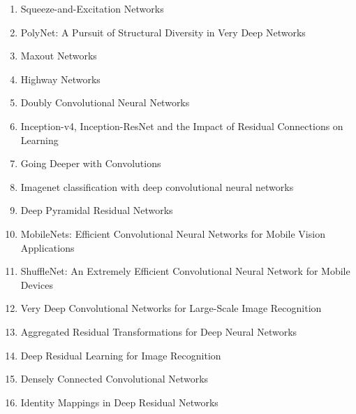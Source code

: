 \documentclass[acmlarge]{acmart}
\begin{document}
\begin{enumerate}
	\item Squeeze-and-Excitation Networks \cite{hu2017squeezeandexcitation} 

	\item PolyNet: A Pursuit of Structural Diversity in Very Deep Networks \cite{zhang2016polynet} 

	\item Maxout Networks \cite{goodfellow2013maxout} 

	\item Highway Networks \cite{srivastava2015highway} 

	\item Doubly Convolutional Neural Networks \cite{zhai2016doubly} 

	\item Inception-v4, Inception-ResNet and the Impact of Residual Connections on Learning \cite{szegedy2016inceptionv4} 

	\item Going Deeper with Convolutions \cite{szegedy2014going} 

	\item Imagenet classification with deep convolutional neural networks \cite{Krizhevsky_imagenetclassification} 

	\item Deep Pyramidal Residual Networks \cite{han2016deep} 

	\item MobileNets: Efficient Convolutional Neural Networks for Mobile Vision Applications \cite{howard2017mobilenets} 

	\item ShuffleNet: An Extremely Efficient Convolutional Neural Network for Mobile Devices \cite{zhang2017shufflenet} 

	\item Very Deep Convolutional Networks for Large-Scale Image Recognition \cite{simonyan2014deep} 

	\item Aggregated Residual Transformations for Deep Neural Networks \cite{xie2016aggregated} 

	\item Deep Residual Learning for Image Recognition \cite{he2015deep} 

	\item Densely Connected Convolutional Networks \cite{huang2016densely} 

	\item Identity Mappings in Deep Residual Networks \cite{he2016identity} 


\end{enumerate}
\end{document}

